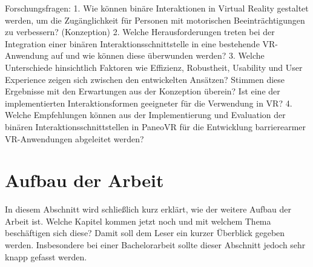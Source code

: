 Forschungsfragen:
1.	Wie können binäre Interaktionen in Virtual Reality gestaltet werden, um die Zugänglichkeit für Personen mit motorischen Beeinträchtigungen zu verbessern? (Konzeption)
2.	Welche Herausforderungen treten bei der Integration einer binären Interaktionsschnittstelle in eine bestehende VR-Anwendung auf und wie können diese überwunden werden? 
3.  Welche Unterschiede hinsichtlich Faktoren wie Effizienz, Robustheit, Usability und User Experience zeigen sich zwischen den entwickelten Ansätzen? Stimmen diese Ergebnisse mit den Erwartungen aus der Konzeption überein? Ist eine der implementierten Interaktionsformen geeigneter für die Verwendung in VR?
4.	Welche Empfehlungen können aus der Implementierung und Evaluation der binären Interaktionsschnittstellen in PaneoVR für die Entwicklung barrierearmer VR-Anwendungen abgeleitet werden? 


\section{Aufbau der Arbeit}

In diesem Abschnitt wird schließlich kurz erklärt, wie der weitere Aufbau der Arbeit ist. Welche Kapitel kommen jetzt noch und mit welchem Thema beschäftigen sich diese? Damit soll dem Leser ein kurzer Überblick gegeben werden. Insbesondere bei einer Bachelorarbeit sollte dieser Abschnitt jedoch sehr knapp gefasst werden.
